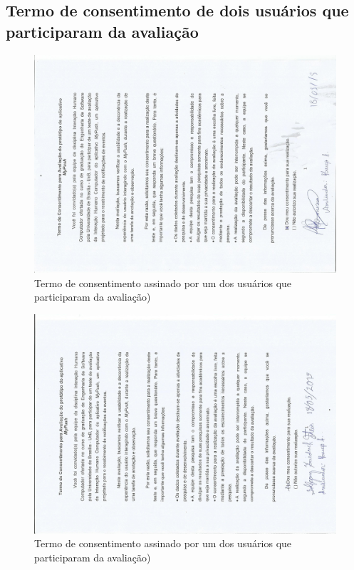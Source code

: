 \begin{anexosenv}
    \section*{Termo de consentimento de dois usuários que participaram da avaliação}

    \begin{figure}[!htbp]
      \centering
      \includegraphics[scale=0.7, angle=-90]{editaveis/figuras/termousuario1}
      \caption{Termo de consentimento assinado por um dos usuários que participaram da avaliação)}
      \label{termo_consentimento_1}
    \end{figure}
    
    \begin{figure}[!htbp]
      \centering
      \includegraphics[scale=0.7, angle=-90]{editaveis/figuras/termousuario2}
      \caption{Termo de consentimento assinado por um dos usuários que participaram da avaliação)}
      \label{termo_consentimento_1}
    \end{figure}
      
  
\end{anexosenv}

